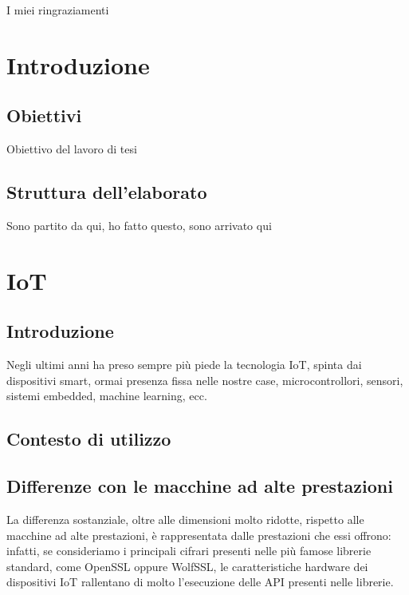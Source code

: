 \documentclass[12pt,a4paper,italian]{report}
\begin{document}

\frontespizio \beforepreface

 I miei ringraziamenti
	
\afterpreface
	
\listoftodos

\chapter{Introduzione}

\section{Obiettivi}

Obiettivo del lavoro di tesi

\section{Struttura dell'elaborato}

Sono partito da qui, ho fatto questo, sono arrivato qui

\newpage

\chapter{IoT}

\section{Introduzione}

Negli ultimi anni ha preso sempre più piede la tecnologia IoT, spinta dai dispositivi smart, ormai presenza fissa nelle nostre case, microcontrollori, sensori, sistemi embedded, machine learning, ecc.

\section{Contesto di utilizzo}

\section{Differenze con le macchine ad alte prestazioni}

La differenza sostanziale, oltre alle dimensioni molto ridotte, rispetto alle macchine ad alte prestazioni, è rappresentata dalle prestazioni che essi offrono: infatti, se consideriamo i principali cifrari presenti nelle più famose librerie standard, come OpenSSL oppure WolfSSL, le caratteristiche hardware dei dispositivi IoT rallentano di molto l'esecuzione delle API presenti nelle librerie. 
\end{document}
